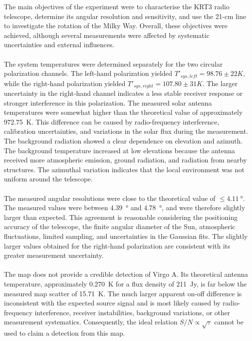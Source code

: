 \documentclass[10pt,a4paper, bibliography=totoc]{scrartcl}
\begin{document}
The main objectives of the experiment were to characterise the KRT3 radio telescope, determine its angular resolution and sensitivity, and use the 21-cm line to investigate the rotation of the Milky Way. Overall, these objectives were achieved, although several measurements were affected by systematic uncertainties and external influences.\\\\
The system temperatures were determined separately for the two circular polarization channels. The left-hand polarization yielded
$T'_{sys,left}=98.76\pm22K$, while the right-hand polarization yielded
$T'_{sys,right}=107.80\pm31K$. The larger uncertainty in the right-hand channel indicates a less stable receiver response or stronger interference in this polarization. The measured solar antenna temperatures were somewhat higher than the theoretical value of approximately \qty{972.75}{K}. This difference can be caused by radio-frequency interference, calibration uncertainties, and variations in the solar flux during the measurement.\\
The background radiation showed a clear dependence on elevation and azimuth. The background temperature increased at low elevations because the antenna received more atmospheric emission, ground radiation, and radiation from nearby structures. The azimuthal variation indicates that the local environment was not uniform around the telescope.\\\\
The measured angular resolutions were close to the theoretical value of  $\leq\qty{4.11}{\degree}$. The measured values were between \qty{4.39}{\degree} and \qty{4.78}{\degree}, and were therefore slightly larger than expected. This agreement is reasonable considering the positioning accuracy of the telescope, the finite angular diameter of the Sun, atmospheric fluctuations, limited sampling, and uncertainties in the Gaussian fits. The slightly larger values obtained for the right-hand polarization are consistent with its greater measurement uncertainty.\\\\
The map does not provide a credible detection of Virgo A. Its theoretical antenna temperature, approximately \qty{0.270}{K} for a flux density of \qty{211}{Jy}, is far below the measured map scatter of \qty{15.71}{K}. The much larger apparent on-off difference is inconsistent with the expected source signal and is most likely caused by radio-frequency interference, receiver instabilities, background variations, or other measurement systematics. Consequently, the ideal relation $S/N\propto\sqrt{\tau}$ cannot be used to claim a detection from this map.\\\\
\end{document}
